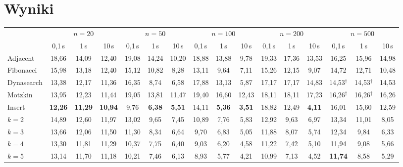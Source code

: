 \documentclass[letterpaper]{article} %
\theoremstyle{definition}
\begin{document}
\section{Wyniki}\label{sec:wyniki}
\begin{table}[t]
\centering
\small
\setlength{\tabcolsep}{4pt}
\begin{tabular}{@{}l*{15}{c}@{}}
\toprule
 & \multicolumn{3}{c}{$n=20$} & \multicolumn{3}{c}{$n=50$}
 & \multicolumn{3}{c}{$n=100$} & \multicolumn{3}{c}{$n=200$}
 & \multicolumn{3}{c}{$n=500$} \\
\cmidrule(lr){2-4}\cmidrule(lr){5-7}\cmidrule(lr){8-10}\cmidrule(lr){11-13}\cmidrule(l){14-16}
 & 0{,}1\,s & 1\,s & 10\,s & 0{,}1\,s & 1\,s & 10\,s & 0{,}1\,s & 1\,s & 10\,s
 & 0{,}1\,s & 1\,s & 10\,s & 0{,}1\,s & 1\,s & 10\,s \\
\midrule
Adjacent & 18{,}66 & 14{,}09 & 12{,}40 & 19{,}08 & 14{,}24 & 10{,}20 & 18{,}88 & 13{,}88 & 9{,}78 & 19{,}33 & 17{,}36 & 13{,}53 & 16{,}25 & 15{,}96 & 14{,}98 \\
Fibonacci & 15{,}98 & 13{,}18 & 12{,}40 & 15{,}12 & 10{,}82 & 8{,}28 & 13{,}11 & 9{,}64 & 7{,}11 & 15{,}26 & 12{,}15 & 9{,}07 & 14{,}72 & 12{,}71 & 10{,}48 \\
Dynasearch & 13{,}38 & 12{,}17 & 11{,}36 & 16{,}35 & 8{,}74 & 6{,}58 & 17{,}88 & 13{,}13 & 5{,}87 & 17{,}17 & 17{,}17 & 14{,}83 & 14{,}53$^\dagger$ & 14{,}53$^\dagger$ & 14{,}53 \\
Motzkin & 13{,}95 & 12{,}23 & 11{,}44 & 19{,}05 & 13{,}81 & 11{,}47 & 19{,}40 & 16{,}60 & 12{,}43 & 18{,}11 & 18{,}11 & 17{,}23 & 16{,}26$^\dagger$ & 16{,}26$^\dagger$ & 16{,}26 \\
\midrule
Insert & \textbf{12{,}26} & \textbf{11{,}29} & \textbf{10{,}94} & 9{,}76 & \textbf{6{,}38} & \textbf{5{,}51} & 14{,}11 & \textbf{5{,}36} & \textbf{3{,}51} & 18{,}82 & 12{,}49 & \textbf{4{,}11} & 16{,}01 & 15{,}60 & 12{,}59 \\
\midrule
$k=2$ & 14{,}89 & 12{,}60 & 11{,}97 & 13{,}02 & 9{,}65 & 7{,}45 & 10{,}89 & 7{,}76 & 5{,}83 & 12{,}92 & 9{,}63 & 6{,}97 & 13{,}34 & 11{,}01 & 8{,}05 \\
$k=3$ & 13{,}66 & 12{,}06 & 11{,}50 & 11{,}30 & 8{,}34 & 6{,}64 & 9{,}70 & 6{,}83 & 5{,}05 & 11{,}88 & 8{,}07 & 5{,}74 & 12{,}34 & 9{,}84 & 6{,}33 \\
$k=4$ & 13{,}30 & 11{,}81 & 11{,}29 & 10{,}37 & 7{,}75 & 6{,}40 & 9{,}03 & 6{,}20 & 4{,}58 & 11{,}22 & 7{,}42 & 5{,}10 & 11{,}94 & 9{,}08 & 5{,}66 \\
$k=5$ & 13{,}14 & 11{,}70 & 11{,}18 & 10{,}21 & 7{,}46 & 6{,}13 & 8{,}93 & 5{,}77 & 4{,}21 & 10{,}99 & 7{,}13 & 4{,}52 & \textbf{11{,}74} & 8{,}58 & 5{,}29 \\

\end{tabular}
\end{table}
\end{document}
